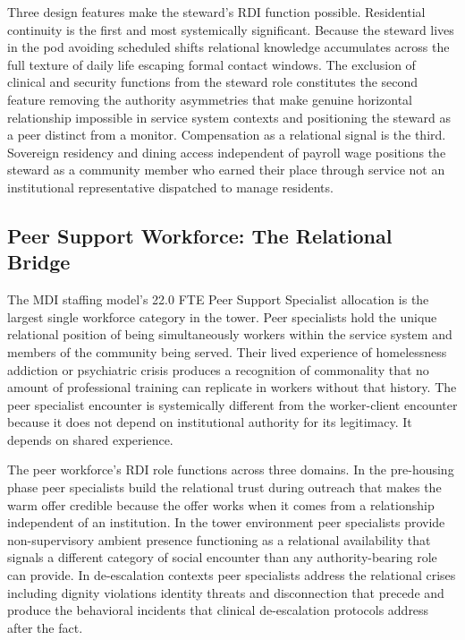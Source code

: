 \documentclass[12pt, letterpaper]{article}
\begin{document}
Three design features make the steward's RDI function possible. Residential continuity is the first and most systemically significant. Because the steward lives in the pod avoiding scheduled shifts relational knowledge accumulates across the full texture of daily life escaping formal contact windows. The exclusion of clinical and security functions from the steward role constitutes the second feature removing the authority asymmetries that make genuine horizontal relationship impossible in service system contexts and positioning the steward as a peer distinct from a monitor. Compensation as a relational signal is the third. Sovereign residency and dining access independent of payroll wage positions the steward as a community member who earned their place through service not an institutional representative dispatched to manage residents.

\subsection{Peer Support Workforce: The Relational Bridge}

The MDI staffing model's 22.0 FTE Peer Support Specialist allocation is the largest single workforce category in the tower. Peer specialists hold the unique relational position of being simultaneously workers within the service system and members of the community being served. Their lived experience of homelessness addiction or psychiatric crisis produces a recognition of commonality that no amount of professional training can replicate in workers without that history. The peer specialist encounter is systemically different from the worker-client encounter because it does not depend on institutional authority for its legitimacy. It depends on shared experience.

The peer workforce's RDI role functions across three domains. In the pre-housing phase peer specialists build the relational trust during outreach that makes the warm offer credible because the offer works when it comes from a relationship independent of an institution. In the tower environment peer specialists provide non-supervisory ambient presence functioning as a relational availability that signals a different category of social encounter than any authority-bearing role can provide. In de-escalation contexts peer specialists address the relational crises including dignity violations identity threats and disconnection that precede and produce the behavioral incidents that clinical de-escalation protocols address after the fact.
\end{document}
